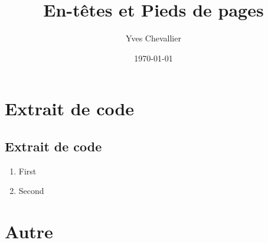 \documentclass[a4paper,twoside,12pt]{article}
\title{En-têtes et Pieds de pages}
\author{Yves Chevallier}
\date{\today}
\begin{document}
\maketitle

\section{Extrait de code}
\subsection{Extrait de code}

\begin{enumerate}
    \item First
    \item Second
\end{enumerate}

\lipsum[1-6]

\section{Autre}

\lipsum[6-12]
\end{document}
